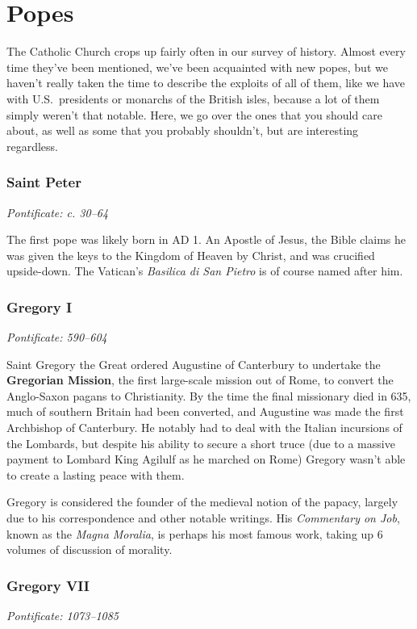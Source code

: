 \chapter{Popes}

\newcommand{\papacy}[2]{\noindent\textit{Pontificate: #1--#2}}

The Catholic Church crops up fairly often in our survey of history.
Almost every time they've been mentioned, we've been acquainted with new popes,
but we haven't really taken the time to describe the exploits of all of them,
like we have with U.S.\ presidents or monarchs of the British isles,
because a lot of them simply weren't that notable.
Here, we go over the ones that you should care about,
as well as some that you probably shouldn't, but are interesting regardless.

\subsection*{Saint Peter}
\papacy{c. 30}{64}

The first pope was likely born in AD 1.
An Apostle of Jesus, the Bible claims he was given the keys to the Kingdom of Heaven by Christ,
and was crucified upside-down.
The Vatican's \textit{Basilica di San Pietro} is of course named after him.

\subsection*{Gregory I}
\papacy{590}{604}

Saint Gregory the Great ordered Augustine of Canterbury to undertake the \textbf{Gregorian Mission},
the first large-scale mission out of Rome,
to convert the Anglo-Saxon pagans to Christianity.
By the time the final missionary died in 635, much of southern Britain had been converted,
and Augustine was made the first Archbishop of Canterbury.
He notably had to deal with the Italian incursions of the Lombards,
but despite his ability to secure a short truce
(due to a massive payment to Lombard King Agilulf as he marched on Rome)
Gregory wasn't able to create a lasting peace with them.

Gregory is considered the founder of the medieval notion of the papacy,
largely due to his correspondence and other notable writings.
His \textit{Commentary on Job}, known as the \textit{Magna Moralia},
is perhaps his most famous work, taking up 6 volumes of discussion of morality.

\subsection*{Gregory VII}
\papacy{1073}{1085}

